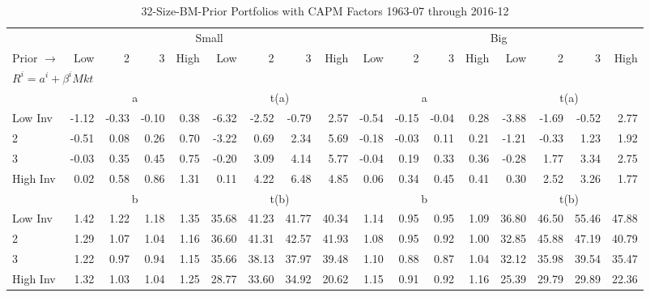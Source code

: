 
\begin{table}[!ht]
\footnotesize
\centering
\caption{32-Size-BM-Prior Portfolios with CAPM Factors 1963-07 through 2016-12}
\begin{tabular}{lrrrrrrrrrrrrrrrr}
  \toprule
    & \multicolumn{8}{c}{Small} & \multicolumn{8}{c}{Big} \\
      \cmidrule(r){2-9} \cmidrule(r){10-17}
    Prior $\rightarrow$ & Low & 2 & 3 & High & Low & 2 & 3 & High & Low & 2 & 3 & High & Low & 2 & 3 & High \\ 
  \midrule
  \multicolumn{17}{l}{$R^i=a^i+\beta^iMkt$} \\

  
    
      & \multicolumn{4}{c}{a} & \multicolumn{4}{c}{t(a)}
    
      & \multicolumn{4}{c}{a} & \multicolumn{4}{c}{t(a)}
    
    \\
      \cmidrule(r){2-5} \cmidrule(r){6-9} \cmidrule(r){10-13} \cmidrule(r){14-17}

    Low Inv   & -1.12  & -0.33  & -0.10  & 0.38  & -6.32  & -2.52  & -0.79  & 2.57  & -0.54  & -0.15  & -0.04  & 0.28  & -3.88  & -1.69  & -0.52  & 2.77  \\
           2  & -0.51  & 0.08  & 0.26  & 0.70  & -3.22  & 0.69  & 2.34  & 5.69  & -0.18  & -0.03  & 0.11  & 0.21  & -1.21  & -0.33  & 1.23  & 1.92  \\
           3  & -0.03  & 0.35  & 0.45  & 0.75  & -0.20  & 3.09  & 4.14  & 5.77  & -0.04  & 0.19  & 0.33  & 0.36  & -0.28  & 1.77  & 3.34  & 2.75  \\
    High Inv  & 0.02  & 0.58  & 0.86  & 1.31  & 0.11  & 4.22  & 6.48  & 4.85  & 0.06  & 0.34  & 0.45  & 0.41  & 0.30  & 2.52  & 3.26  & 1.77  \\

  
    
      & \multicolumn{4}{c}{b} & \multicolumn{4}{c}{t(b)}
    
      & \multicolumn{4}{c}{b} & \multicolumn{4}{c}{t(b)}
    
    \\
      \cmidrule(r){2-5} \cmidrule(r){6-9} \cmidrule(r){10-13} \cmidrule(r){14-17}

    Low Inv   & 1.42  & 1.22  & 1.18  & 1.35  & 35.68  & 41.23  & 41.77  & 40.34  & 1.14  & 0.95  & 0.95  & 1.09  & 36.80  & 46.50  & 55.46  & 47.88  \\
           2  & 1.29  & 1.07  & 1.04  & 1.16  & 36.60  & 41.31  & 42.57  & 41.93  & 1.08  & 0.95  & 0.92  & 1.00  & 32.85  & 45.88  & 47.19  & 40.79  \\
           3  & 1.22  & 0.97  & 0.94  & 1.15  & 35.66  & 38.13  & 37.97  & 39.48  & 1.10  & 0.88  & 0.87  & 1.04  & 32.12  & 35.98  & 39.54  & 35.47  \\
    High Inv  & 1.32  & 1.03  & 1.04  & 1.25  & 28.77  & 33.60  & 34.92  & 20.62  & 1.15  & 0.91  & 0.92  & 1.16  & 25.39  & 29.79  & 29.89  & 22.36  \\

  

  \bottomrule
\end{tabular}
\label{tbl:32_Size_BM_Prior_CAPM}
\end{table}
